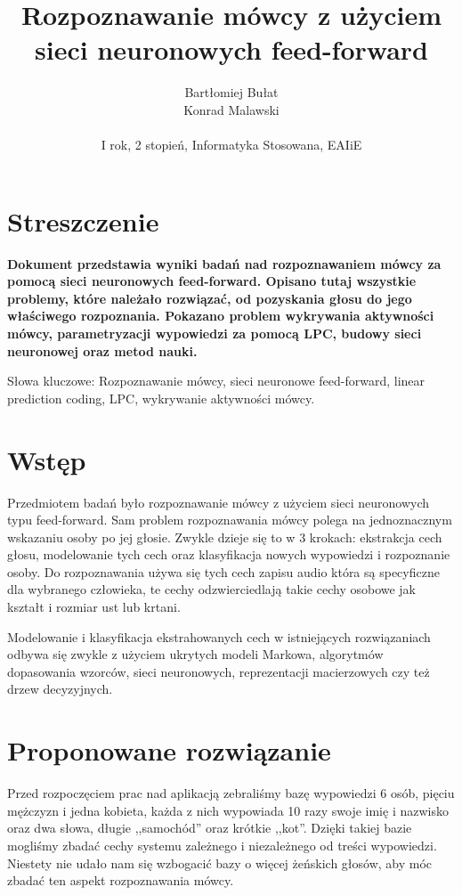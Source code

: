 \documentclass[a4paper]{article}
\title{Rozpoznawanie mówcy z użyciem sieci neuronowych feed-forward}
\author{
Bartłomiej Bułat\\
Konrad Malawski\\
\\
I rok, 2 stopień, Informatyka Stosowana, EAIiE}
\begin{document}
\maketitle

\section{Streszczenie}

\textbf{
Dokument przedstawia wyniki badań nad rozpoznawaniem mówcy za pomocą sieci
neuronowych feed-forward. Opisano tutaj wszystkie problemy, które należało
rozwiązać, od pozyskania głosu do jego właściwego rozpoznania. Pokazano problem
wykrywania aktywności mówcy, parametryzacji wypowiedzi za pomocą LPC, budowy 
sieci neuronowej oraz metod nauki.}

Słowa kluczowe: Rozpoznawanie mówcy, sieci neuronowe feed-forward, linear prediction 
coding, LPC, wykrywanie aktywności mówcy.

\section{Wstęp}

Przedmiotem badań było rozpoznawanie mówcy z użyciem sieci neuronowych typu
feed-forward. Sam problem rozpoznawania mówcy polega na jednoznacznym wskazaniu
osoby po jej głosie. Zwykle dzieje się to w 3 krokach: ekstrakcja cech głosu,
modelowanie tych cech oraz klasyfikacja nowych wypowiedzi i rozpoznanie osoby.
Do rozpoznawania używa się tych cech zapisu audio która są specyficzne dla
wybranego człowieka, te cechy odzwierciedlają takie cechy osobowe jak kształt
i rozmiar ust lub krtani.

Modelowanie i klasyfikacja ekstrahowanych cech w istniejących rozwiązaniach
odbywa się zwykle z użyciem ukrytych modeli Markowa, algorytmów dopasowania
wzorców, sieci neuronowych, reprezentacji macierzowych czy też drzew
decyzyjnych.

\section{Proponowane rozwiązanie}

Przed rozpoczęciem prac nad aplikacją zebraliśmy bazę wypowiedzi 6 osób, pięciu
mężczyzn i jedna kobieta, każda
z nich wypowiada 10 razy swoje imię i nazwisko oraz dwa słowa, długie
,,samochód'' oraz krótkie ,,kot''. Dzięki takiej bazie mogliśmy zbadać cechy
systemu zależnego i niezależnego od treści wypowiedzi. Niestety nie udało nam
się wzbogacić bazy o więcej żeńskich głosów, aby móc zbadać ten aspekt
rozpoznawania mówcy.
\end{document}

